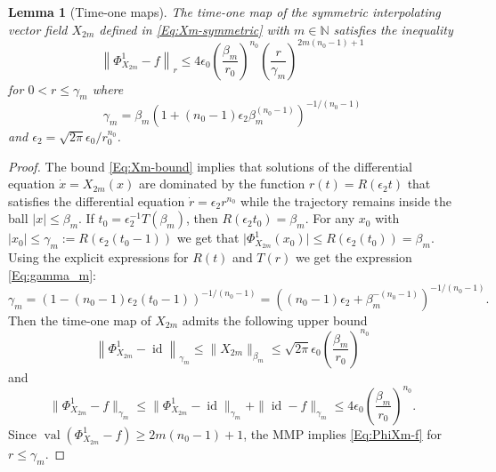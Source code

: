 \documentclass[a4paper,12pt]{article}
\newcommand\id{\operatorname{id}}
\newtheorem{lemma}[thm]{Lemma}
\begin{document}
\begin{lemma}[Time-one maps]
The time-one map of the symmetric interpolating vector field $X_{2m}$ 
defined in \eqref{Eq:Xm-symmetric} with  $m\in\mathbb N$  satisfies the inequality
\begin{equation}\label{Eq:PhiXm-f}
    \left\|\Phi_{X_{2m}}^1-f\right\|_r
    \le
        4\epsilon_0\left(\frac{\beta_m}{r_0}\right)^{n_0}
    \left(
\frac{r}{\gamma_m}    \right)^{2 m(n_0-1)+1}
\end{equation}
for  $0<r\le \gamma_m$ where  
\begin{equation}\label{Eq:gamma_m}
   \gamma_m=\beta_m\left(1+(n_0-1)\epsilon_2\beta_m^{(n_0-1)}
\right)^{-1/(n_0-1)}
\end{equation}
and $\epsilon_2=\sqrt{2\pi}\epsilon_0/r_0^{n_0} $.
\end{lemma}

\begin{proof}
The bound \eqref{Eq:Xm-bound} implies that  solutions of the differential equation $\dot x=X_{2m}(x)$
are dominated by the function 
$r(t)=R(\epsilon_2 t)$ that satisfies  the differential equation
$\dot r=\epsilon_2r^{n_0}$ while the trajectory remains inside the ball $|x|\le\beta_m$. If $t_0=\epsilon_2^{-1}T(\beta_m)$, then $R(\epsilon_2 t_0)=\beta_m$. 
For any $x_0$ with $|x_0|\le \gamma_m:=R(\epsilon_2 (t_0-1))$ 
we get that $\bigl|\Phi^1_{X_{2m}}(x_0)\bigr|\le
R(\epsilon_2 (t_0))=\beta_m$.
Using the explicit expressions for $R(t)$ and $T(r)$
we get the expression \eqref{Eq:gamma_m}:
\[
\gamma_m=\left(1-(n_0-1)\epsilon_2(t_0-1)
\right)^{-1/(n_0-1)}
=\left((n_0-1)\epsilon_2+\beta_m^{-(n_0-1)}
\right)^{-1/(n_0-1)}.
\]
Then the time-one map of $X_{2m}$  admits the following upper bound
\[
\left\|
\Phi_{X_{2m}}^1-\id
\right\|_{\gamma_m}
\le 
\|X_{2m}\|_{\beta_m}\le
\sqrt{2\pi}\epsilon_0\left(\frac{\beta_m}{r_0}\right)^{n_0}
\]
and
\[
\|\Phi_{X_{2m}}^1-f\|_{\gamma_m}\le \|\Phi_{X_{2m}}^1-\id\|_{\gamma_m}+\|\id-f\|_{\gamma_m}
\le 
4\epsilon_0\left(\frac{\beta_m}{r_0}\right)^{n_0}
.
\]
Since $\operatorname{val}(\Phi_{X_{2m}}^1-f) \geq 2m(n_0-1)+1$,
the MMP implies 
\eqref{Eq:PhiXm-f} for $r\le \gamma_m$.
\end{proof}
\end{document}
